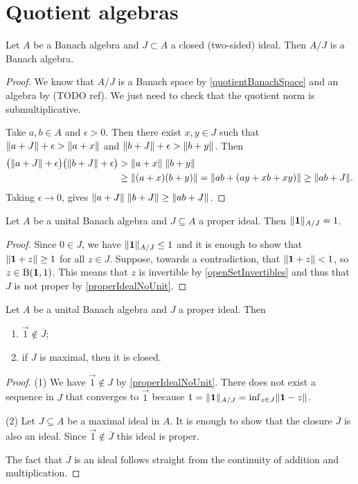 \section{Quotient algebras}
\begin{proposition}
Let $A$ be a Banach algebra and $J\subset A$ a closed (two-sided) ideal. Then $A/J$ is a Banach algebra.
\end{proposition}
\begin{proof}
We know that $A/J$ is a Banach space by \ref{quotientBanachSpace} and an algebra by (TODO ref). We just need to check that the quotient norm is submultiplicative.

Take $a,b\in A$ and $\epsilon>0$. Then there exist $x,y\in J$ such that $\lVert a+J\rVert + \epsilon > \lVert a+x\rVert$ and $\lVert b+J\rVert + \epsilon > \lVert b+y\rVert$. Then
\begin{align*}
\big(\lVert a+J\rVert + \epsilon\big)\big(\lVert b+J\rVert + \epsilon\big) &> \lVert a+x\rVert\;\lVert b+y\rVert \\
&\geq \lVert(a+x)(b+y)\rVert = \lVert ab + (ay+xb+xy)\rVert \geq \lVert ab + J\rVert.
\end{align*}
Taking $\epsilon\to 0$, gives $\lVert a+J\rVert\;\lVert b+J\rVert \geq \lVert ab + J\rVert$.
\end{proof}

\begin{proposition}
Let $A$ be a unital Banach algebra and $J\subseteq A$ a proper ideal. Then $\lVert\boldsymbol{\mathrm{1}}\rVert_{A/J} = 1$.
\end{proposition}
\begin{proof}
Since $0\in J$, we have $\lVert\boldsymbol{\mathrm{1}}\rVert_{A/J} \leq 1$ and it is enough to show that $\lVert\boldsymbol{\mathrm{1}}+z\rVert \geq 1$ for all $z\in J$. Suppose, towards a contradiction, that $\lVert\boldsymbol{\mathrm{1}}+z\rVert < 1$, so $z\in \operatorname{B}(\boldsymbol{\mathrm{1}},1)$. This means that $z$ is invertible by \ref{openSetInvertibles} and thus that $J$ is not proper by \ref{properIdealNoUnit}.
\end{proof}
\begin{corollary}
Let $A$ be a unital Banach algebra and $J$ a proper ideal. Then
\begin{enumerate}
\item $\vec{1} \notin \overline{J}$;
\item if $J$ is maximal, then it is closed.
\end{enumerate}
\end{corollary}
\begin{proof}
(1) We have $\vec{1}\notin J$ by \ref{properIdealNoUnit}. There does not exist a sequence in $J$ that converges to $\vec{1}$ because $1 = \lVert\boldsymbol{\mathrm{1}}\rVert_{A/J} = \inf_{z\in J}\lVert\boldsymbol{\mathrm{1}}-z\rVert$.

(2) Let $J\subseteq A$ be a maximal ideal in $A$. It is enough to show that the closure $\overline{J}$ is also an ideal. Since $\vec{1}\notin \overline{J}$ this ideal is proper.

The fact that $\overline{J}$ is an ideal follows straight from the continuity of addition and multiplication.
\end{proof}

